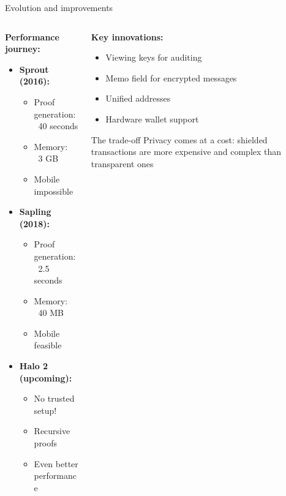 \documentclass[aspectratio=169, lualatex, handout]{beamer}
\begin{document}
\begin{frame}{Evolution and improvements}
	\begin{columns}[c]
		\begin{column}{0.5\textwidth}
			\textbf{Performance journey:}
			\begin{itemize}
				\item \textbf{Sprout (2016):}
				      \begin{itemize}
					      \item Proof generation: ~40 seconds
					      \item Memory: ~3 GB
					      \item Mobile impossible
				      \end{itemize}
				\item \textbf{Sapling (2018):}
				      \begin{itemize}
					      \item Proof generation: ~2.5 seconds
					      \item Memory: ~40 MB
					      \item Mobile feasible
				      \end{itemize}
				\item \textbf{Halo 2 (upcoming):}
				      \begin{itemize}
					      \item No trusted setup!
					      \item Recursive proofs
					      \item Even better performance
				      \end{itemize}
			\end{itemize}
		\end{column}
		\begin{column}{0.5\textwidth}
			\textbf{Key innovations:}
			\begin{itemize}
				\item Viewing keys for auditing
				\item Memo field for encrypted messages
				\item Unified addresses
				\item Hardware wallet support
			\end{itemize}
			\vspace{0.5em}
			\begin{alertblock}{The trade-off}
				Privacy comes at a cost: shielded transactions are more expensive and complex than transparent ones
			\end{alertblock}
		\end{column}
	\end{columns}
\end{frame}
\end{document}
